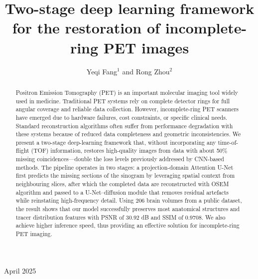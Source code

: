 \documentclass[12pt]{iopart}
\begin{document}
\title{Two-stage deep learning framework for the restoration of incomplete-ring PET images}


\author{Yeqi Fang$^1$ and Rong Zhou$^2$}
\address{College of Physics, Sichuan University, Chengdu, 610065, China}

\vspace{10pt}
\begin{indented}
\item[]April 2025
\end{indented}

\begin{abstract}
Positron Emission Tomography (PET) is an important molecular imaging tool widely used in medicine. Traditional PET systems rely on complete detector rings for full angular coverage and reliable data collection. However, incomplete-ring PET scanners have emerged due to hardware failures, cost constraints, or specific clinical needs. Standard reconstruction algorithms often suffer from performance degradation with these systems because of reduced data completeness and geometric inconsistencies. We present a two-stage deep-learning framework that, without incorporating any time-of-flight (TOF) information, restores high-quality images from data with about 50\% missing coincidences—double the loss levels previously addressed by CNN-based methods. The pipeline operates in two stages: a projection-domain Attention U-Net first predicts the missing sections of the sinogram by leveraging spatial context from neighbouring slices, after which the completed data are reconstructed with OSEM algorithm and passed to a U-Net–diffusion module that removes residual artefacts while reinstating high-frequency detail. Using 206 brain volumes from a public dataset, the result shows that our model successfully preserves most anatomical structures and tracer distribution features with PSNR of 30.92 dB and SSIM of 0.9708. We also achieve higher inference speed, thus providing an effective solution for incomplete-ring PET imaging.



\end{abstract}

%
%
%
% 
%
\end{document}

